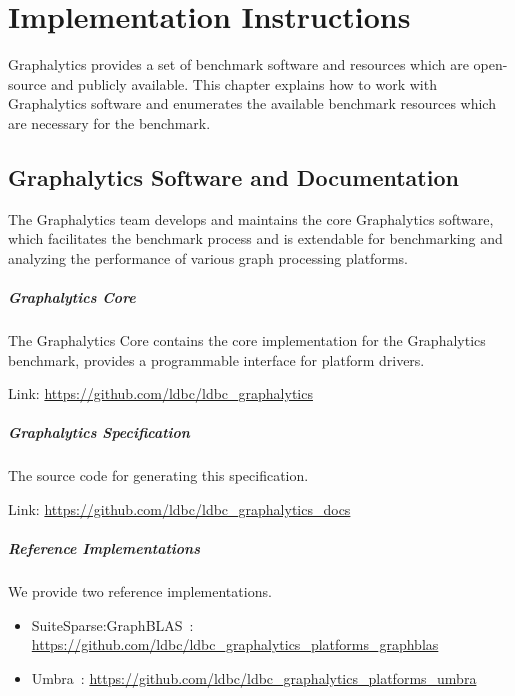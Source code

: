 \chapter{Implementation Instructions}
\label{chap:instructions}
Graphalytics provides a set of benchmark software and resources which are open-source and publicly available. This chapter explains how to work with Graphalytics software and enumerates the available benchmark resources which are necessary for the benchmark.



\section{Graphalytics Software and Documentation}\label{sec:instructions:core}
The Graphalytics team develops and maintains the core Graphalytics software, which facilitates the benchmark process and is extendable for benchmarking and analyzing the performance of various graph processing platforms.

\paragraph{Graphalytics Core}
The Graphalytics Core contains the core implementation for the Graphalytics benchmark, provides a programmable interface for platform drivers.

\quad Link: \url{https://github.com/ldbc/ldbc_graphalytics}

\paragraph{Graphalytics Specification}
The source code for generating this specification.

\quad Link: \url{https://github.com/ldbc/ldbc_graphalytics_docs}

\paragraph{Reference Implementations}

We provide two reference implementations.

\begin{itemize}
	\item SuiteSparse:GraphBLAS~\cite{DBLP:journals/toms/Davis19}: \url{https://github.com/ldbc/ldbc_graphalytics_platforms_graphblas}
	\item Umbra~\cite{DBLP:conf/cidr/NeumannF20}: \url{https://github.com/ldbc/ldbc_graphalytics_platforms_umbra}
\end{itemize}

